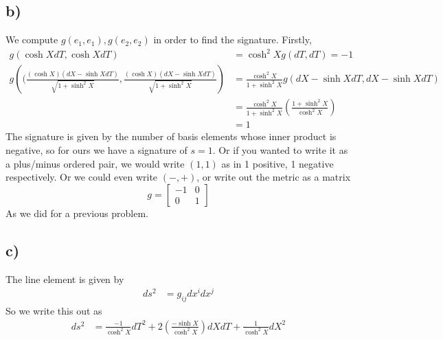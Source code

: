 \documentclass{article}
\theoremstyle{definition}
\begin{document}
\subsection*{b)}
We compute $g(e_1,e_1), g(e_2,e_2)$ in order to find the signature. Firstly,
\begin{align*}
    g(\cosh X dT, \cosh X dT) &= \cosh^2 X g(dT,dT) = -1 \\
    g\left((\frac{(\cosh X)(dX - \sinh X dT)}{\sqrt{1 + \sinh^2 X}},\frac{(\cosh X)(dX - \sinh X dT)}{\sqrt{1 + \sinh^2 X}}\right) &= \frac{\cosh^2 X}{1 + \sinh^2 X} g(dX - \sinh X dT, dX - \sinh X dT) \\
    &= \frac{\cosh^2 X}{1 + \sinh^2 X} \left(\frac{1 + \sinh^2 X}{\cosh^2 X}\right)\\
    & = 1
\end{align*}
The signature is given by the number of basis elements whose inner product is negative, so for ours we have 
a signature of $s = 1$. Or if you wanted to write it as a plus/minus ordered pair, we would write $(1,1)$ as in 1 positive, 1 negative 
respectively. Or we could even write $(-,+)$, or write out the metric as a matrix 
\[
    g = \begin{bmatrix}
        -1&0\\0&1
    \end{bmatrix}
\]
As we did for a previous problem.
\subsection*{c)}
The line element is given by 
\begin{align*}
    ds^2 &= g_{ij}dx^idx^j
\end{align*}
So we write this out as
\begin{align*}
   ds^2 &= \frac{-1}{\cosh^2 X}dT^2 + 2\left(\frac{-\sinh X}{\cosh^2X}\right)dXdT + \frac{1}{\cosh^2X}dX^2
\end{align*}
\end{document}
